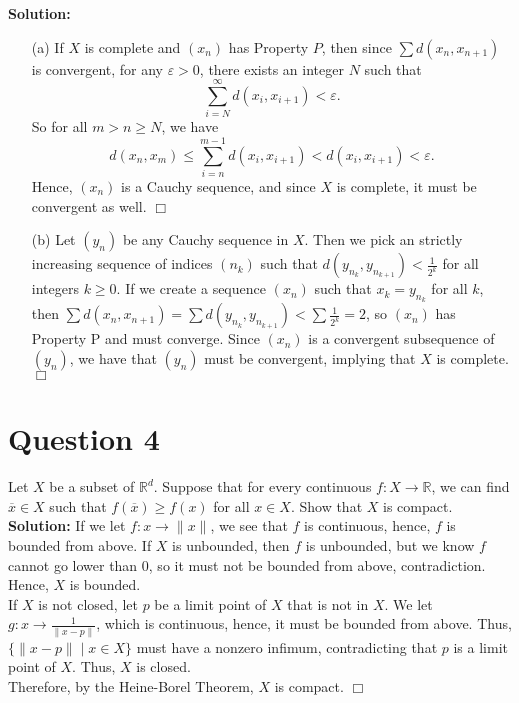 \documentclass[12pt]{article}
\begin{document}
\noindent \textbf{Solution:} 
\begin{enumerate}
    \item[(a)] If $X$ is complete and $(x_n)$ has Property $P$, then since $\sum d(x_n, x_{n+1})$ is convergent, for any $\varepsilon > 0$, there exists an integer $N$ such that \[\sum_{i=N}^{\infty} d(x_i, x_{i+1}) < \varepsilon.\] So for all $m > n \ge N$, we have \[d(x_n, x_m) \le \sum_{i=n}^{m-1} d(x_i, x_{i+1}) < d(x_i, x_{i+1}) < \varepsilon.\] Hence, $(x_n)$ is a Cauchy sequence, and since $X$ is complete, it must be convergent as well. \hfill $\Box$
    \item[(b)] Let $(y_n)$ be any Cauchy sequence in $X$. Then we pick an strictly increasing sequence of indices $(n_k)$ such that $d(y_{n_k}, y_{n_{k+1}}) < \frac{1}{2^k}$ for all integers $k \ge 0$. If we create a sequence $(x_n)$ such that $x_k = y_{n_k}$ for all $k$, then $\sum d(x_n, x_{n+1}) = \sum d(y_{n_k}, y_{n_{k+1}}) < \sum \frac{1}{2^k} = 2$, so $(x_n)$ has Property P and must converge. Since $(x_n)$ is a convergent subsequence of $(y_n)$, we have that $(y_n)$ must be convergent, implying that $X$ is complete. \hfill $\Box$
\end{enumerate}

\section*{Question 4}
Let $X$ be a subset of $\mathbb{R}^d$. Suppose that for every continuous $f : X \to \mathbb{R}$, we can find $\overline{x} \in X$ such that $f(\overline{x}) \ge f(x)$ for all $x \in X$. Show that $X$ is compact. \\

\noindent \textbf{Solution:} If we let $f : x \to \lVert x \rVert$, we see that $f$ is continuous, hence, $f$ is bounded from above. If $X$ is unbounded, then $f$ is unbounded, but we know $f$ cannot go lower than $0$, so it must not be bounded from above, contradiction. Hence, $X$ is bounded. \\

\noindent If $X$ is not closed, let $p$ be a limit point of $X$ that is not in $X$. We let $g : x \to \frac{1}{\lVert x - p \rVert}$, which is continuous, hence, it must be bounded from above. Thus, $\{\lVert x - p \rVert \mid x \in X\}$ must have a nonzero infimum, contradicting that $p$ is a limit point of $X$. Thus, $X$ is closed. \\

\noindent Therefore, by the Heine-Borel Theorem, $X$ is compact. \hfill $\Box$
\end{document}
